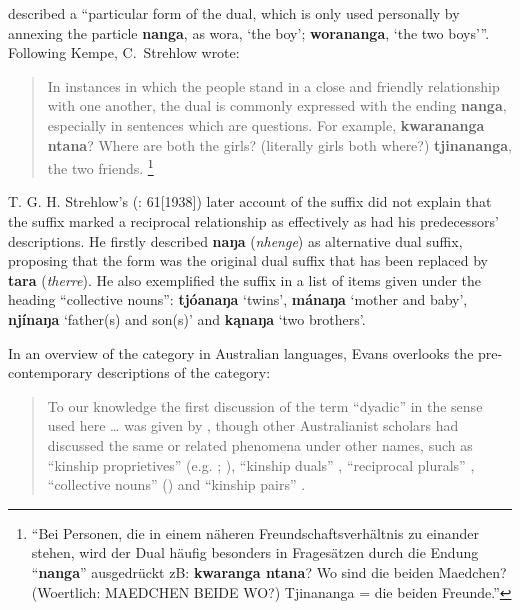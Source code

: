 \citet[3]{kempe_grammar_1891} described a “particular form of the dual, which is only used personally by annexing the particle \textbf{nanga}, as wora, `the boy'; \textbf{worananga}, `the two boys’\thinspace”. Following Kempe, C.~Strehlow wrote:

\begin{quote}
In instances in which the people stand in a close and friendly relationship with one another, the dual is commonly expressed with the ending \textbf{nanga}, especially in sentences which are questions. For example, \textbf{kwarananga nta\-na}? Where are both the girls? (literally girls both where?) \textbf{tjinananga}, the two friends. \citep[25]{strehlow_untitled_1931}\footnote{“Bei Personen, die in einem näheren Freundschaftsverhältnis zu einander stehen, wird der Dual häufig besonders in Fragesätzen durch die Endung “\textbf{nanga}” ausgedrückt zB: \textbf{kwaranga ntana}? Wo sind die beiden Maedchen? (Woertlich: MAEDCHEN BEIDE WO?) Tjinananga = die beiden Freunde.”}
\end{quote}

T. G. H. Strehlow’s (\citeyear{strehlow_aranda_1944}: 61[1938]) later account of the suffix did not explain that the suffix marked a reciprocal relationship as effectively as had his predecessors' descriptions. He firstly described \textbf{naŋa} (\textit{nhenge}) as alternative dual suffix, proposing that the form was the original dual suffix that has been replaced by \textbf{tara} (\textit{therre}). He also exemplified the suffix in a list of items given under the heading ``collective nouns'': \textbf{tjóanaŋa} `twins', \textbf{mánaŋa} `mother and baby', \textbf{njínaŋa} `father(s) and son(s)' and \textbf{kąnaŋa} `two brothers'.

In an overview of the category in Australian languages, Evans overlooks the pre-contemporary descriptions of the category:

\begin{quote}
To our knowledge the first discussion of the term “dyadic” in the sense used here … was given by \citet{MerlanHeath1982}, though other Australianist scholars had discussed the same or related phenomena under other names, such as “kinship proprietives” (e.g. \citealt{breen_gugadj_1976}; \citealt{blake_pitta_1979}), “kinship duals” \citep[234--5]{dixon_dyirbal_1972}, “reciprocal plurals” \citep[104--5]{donaldson_ngiyambaa_1980}, “collective nouns” (\citealt{hercus_perception_1973}) and “kinship pairs” \citep{hercus_bagandji_1982}. \citep[2]{evans_interesting_2003}
\end{quote}

